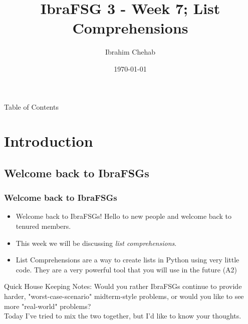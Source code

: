 \documentclass[hyperref={colorlinks,citecolor=blue,linkcolor=blue,urlcolor=blue}]{beamer}
\title[IbraFSG 3: List Comprehensions]{IbraFSG\texttrademark{} 3 - Week 7; List Comprehensions}
\author{Ibrahim Chehab}
\institute{UTM RGASC}
\date{\today}
\begin{document}
\begin{frame}
  \titlepage
\end{frame}

\begin{frame}{Table of Contents}
  \tableofcontents
\end{frame}

\section{Introduction}

\subsection{Welcome back to IbraFSGs\texttrademark{}}
\begin{frame}
  \frametitle{Welcome back to IbraFSGs\texttrademark{}}
  \begin{itemize}
  \item Welcome back to IbraFSGs\texttrademark{}! Hello to new people and welcome back to tenured members.
  \item This week we will be discussing \textit{list comprehensions}.
  \item List Comprehensions are a way to create lists in Python using very little code. They are a very powerful tool that you will use in the future (A2)
\end{itemize}

Quick House Keeping Notes: Would you rather IbraFSGs\texttrademark{} continue to provide harder, "worst-case-scenario" midterm-style problems, or would you like to see more "real-world" problems?\\
Today I've tried to mix the two together, but I'd like to know your thoughts.

\end{frame}
\end{document}
